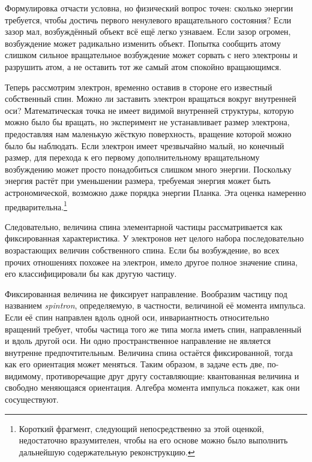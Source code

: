 Формулировка отчасти условна, но физический вопрос точен: сколько энергии требуется, чтобы достичь первого ненулевого вращательного состояния? Если зазор мал, возбуждённый объект всё ещё легко узнаваем. Если зазор огромен, возбуждение может радикально изменить объект. Попытка сообщить атому слишком сильное вращательное возбуждение может сорвать с него электроны и разрушить атом, а не оставить тот же самый атом спокойно вращающимся.

Теперь рассмотрим электрон, временно оставив в стороне его известный собственный спин. Можно ли заставить электрон вращаться вокруг внутренней оси? Математическая точка не имеет видимой внутренней структуры, которую можно было бы вращать, но эксперимент не устанавливает размер электрона, предоставляя нам маленькую жёсткую поверхность, вращение которой можно было бы наблюдать. Если электрон имеет чрезвычайно малый, но конечный размер, для перехода к его первому дополнительному вращательному возбуждению может просто понадобиться слишком много энергии. Поскольку энергия растёт при уменьшении размера, требуемая энергия может быть астрономической, возможно даже порядка энергии Планка. Эта оценка намеренно предварительна.\footnote{Короткий фрагмент, следующий непосредственно за этой оценкой, недостаточно вразумителен, чтобы на его основе можно было выполнить дальнейшую содержательную реконструкцию.}

Следовательно, величина спина элементарной частицы рассматривается как фиксированная характеристика. У электронов нет целого набора последовательно возрастающих величин собственного спина. Если бы возбуждение, во всех прочих отношениях похожее на электрон, имело другое полное значение спина, его классифицировали бы как другую частицу.

Фиксированная величина не фиксирует направление. Вообразим частицу под названием \emph{spintron}, определяемую, в частности, величиной её момента импульса. Если её спин направлен вдоль одной оси, инвариантность относительно вращений требует, чтобы частица того же типа могла иметь спин, направленный и вдоль другой оси. Ни одно пространственное направление не является внутренне предпочтительным. Величина спина остаётся фиксированной, тогда как его ориентация может меняться. Таким образом, в задаче есть две, по-видимому, противоречащие друг другу составляющие: квантованная величина и свободно меняющаяся ориентация. Алгебра момента импульса покажет, как они сосуществуют.

